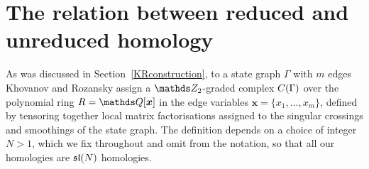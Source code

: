 \documentclass{compositio}
\theoremstyle{definition}
\numberwithin{equation}{section}
\begin{document}
%

\section{The relation between reduced and unreduced homology}
\label{relationReducedUnreduced}

As was discussed in Section~\ref{KRconstruction}, to a state graph $\Gamma$ with $m$ edges Khovanov and Rozansky assign a $\Ztwo$-graded complex $C(\Gamma)$ over the polynomial ring $R = \QQ[\boldsymbol{x}]$ in the edge variables $\boldsymbol{x} = \{x_1,\ldots,x_m\}$, defined by tensoring together local matrix factorisations assigned to the singular crossings and smoothings of the state graph. The definition depends on a choice of integer $N > 1$, which we fix throughout and omit from the notation, so that all our homologies are $\mathfrak{sl}(N)$ homologies.
\end{document}
